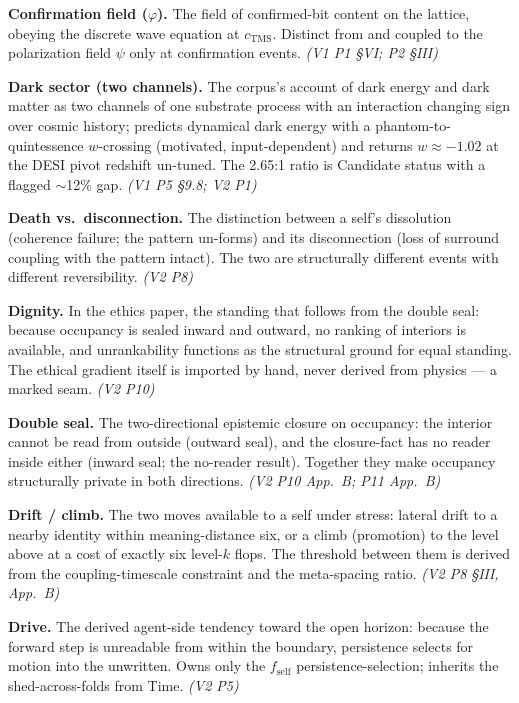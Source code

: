 \documentclass[11pt,oneside]{report}
\theoremstyle{definition}
\theoremstyle{remark}
\begin{document}
\textbf{Confirmation field ($\varphi$).} The field of confirmed-bit content on the lattice, obeying the discrete wave equation at $c_{\mathrm{TMS}}$. Distinct from and coupled to the polarization field $\psi$ only at confirmation events. \emph{(V1 P1 \S VI; P2 \S III)}

\textbf{Dark sector (two channels).} The corpus's account of dark energy and dark matter as two channels of one substrate process with an interaction changing sign over cosmic history; predicts dynamical dark energy with a phantom-to-quintessence $w$-crossing (motivated, input-dependent) and returns $w \approx -1.02$ at the DESI pivot redshift un-tuned. The 2.65:1 ratio is Candidate status with a flagged $\sim$12\% gap. \emph{(V1 P5 \S 9.8; V2 P1)}

\textbf{Death vs.\ disconnection.} The distinction between a self's dissolution (coherence failure; the pattern un-forms) and its disconnection (loss of surround coupling with the pattern intact). The two are structurally different events with different reversibility. \emph{(V2 P8)}

\textbf{Dignity.} In the ethics paper, the standing that follows from the double seal: because occupancy is sealed inward and outward, no ranking of interiors is available, and unrankability functions as the structural ground for equal standing. The ethical gradient itself is imported by hand, never derived from physics --- a marked seam. \emph{(V2 P10)}

\textbf{Double seal.} The two-directional epistemic closure on occupancy: the interior cannot be read from outside (outward seal), and the closure-fact has no reader inside either (inward seal; the no-reader result). Together they make occupancy structurally private in both directions. \emph{(V2 P10 App.\ B; P11 App.\ B)}

\textbf{Drift / climb.} The two moves available to a self under stress: lateral drift to a nearby identity within meaning-distance six, or a climb (promotion) to the level above at a cost of exactly six level-$k$ flops. The threshold between them is derived from the coupling-timescale constraint and the meta-spacing ratio. \emph{(V2 P8 \S III, App.\ B)}

\textbf{Drive.} The derived agent-side tendency toward the open horizon: because the forward step is unreadable from within the boundary, persistence selects for motion into the unwritten. Owns only the $f_{\mathrm{self}}$ persistence-selection; inherits the shed-across-folds from Time. \emph{(V2 P5)}
\end{document}
